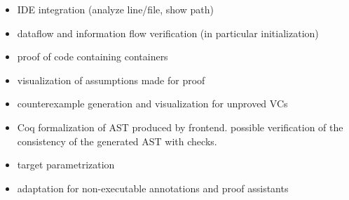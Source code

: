 \documentclass[sttt,draft]{svjour}
\begin{document}
\begin{itemize}
\item IDE integration (analyze line/file, show path)
\item dataflow and information flow verification (in particular initialization)
\item proof of code containing containers
\item visualization of assumptions made for proof
\item counterexample generation and visualization for unproved VCs
\item Coq formalization of AST produced by frontend. possible verification of
  the consistency of the generated AST with checks.
\item target parametrization
\item adaptation for non-executable annotations and proof assistants
\end{itemize}

\label{verifythis}
%


\end{document}
